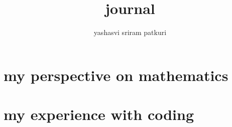 \documentclass[12pt]{report}
\title{journal}
\author{yashasvi sriram patkuri}
\begin{document}
\maketitle



\tableofcontents

\part{my perspective on mathematics}



















\part{my experience with coding}

\end{document}
